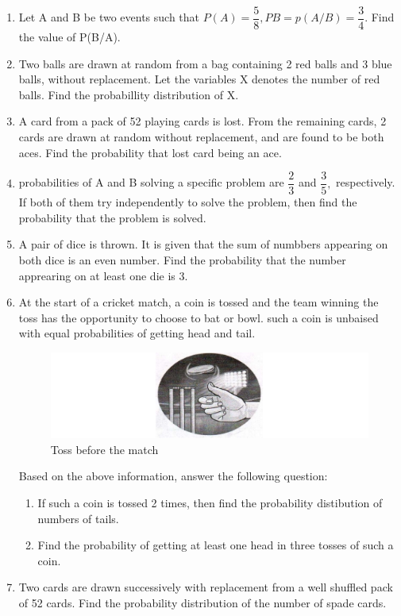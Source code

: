 \begin{enumerate}
\item Let A and B be two events such that $P(A) = \dfrac{5}{8}, P{B} = p(A/B) = \dfrac{3}{4}.$ Find the value of P(B/A).
\item Two balls are drawn at random from a bag containing 2 red balls and 3 blue balls, without replacement. Let the variables X denotes the number of red balls. Find the probabillity distribution of X.
\item A card from a pack of 52 playing cards is lost. From the remaining cards, 2 cards are drawn at random without replacement, and are found to be both aces. Find the probability that lost card being an ace.
\item probabilities of A and B solving a specific problem are $\dfrac{2}{3}$ and $\dfrac{3}{5},$ respectively. If both of them try independently to solve the problem, then find the probability that the problem is  solved.
\item A pair of dice is thrown. It is given that the sum of numbbers  appearing on both dice is an even number. Find the probability that the number apprearing on at least one die is 3.
\item At the start of a cricket match, a coin is tossed and the team winning the toss has the opportunity to choose to bat or bowl. such a coin is unbaised with equal probabilities of getting head and tail.
\begin{figure}[!ht]
\centering
\includegraphics[width=\columnwidth]{figs/coin}
\caption{Toss before the match}
\label{fig:coin1}
\end{figure}
Based on the above information, answer the following question:
\begin{enumerate}
\item If such a coin is tossed 2 times, then find the probability distibution of numbers of tails.
\item Find the probability of getting at least one head in three tosses of such a coin.
\end{enumerate}
\item Two cards are drawn successively with replacement from a well shuffled pack of 52 cards. Find the probability distribution of the number of spade cards.

\end{enumerate}
